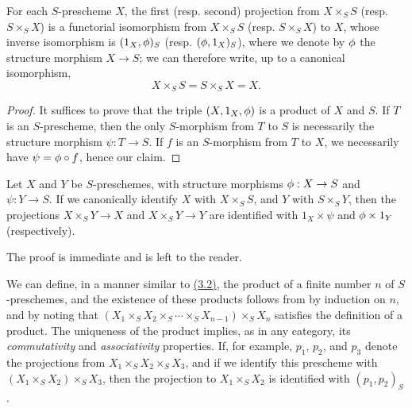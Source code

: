 \begin{proposition}[3.3.3]
\label{I.3.3.3}
For each $S$-prescheme $X$, the first (resp. second) projection from
$X\times_S S$ (resp. $S\times_S X$) is a functorial isomorphism from
$X\times_S S$ (resp. $S\times_S X$) to $X$, whose inverse isomorphism is
$(1_X,\phi)_S$ (resp. $(\phi,1_X)_S$), where we denote by $\phi$ the
structure morphism $X\to S$; we can therefore write, up to a canonical
isomorphism,
\[
  X\times_S S=S\times_S X=X.
\]
\end{proposition}

\begin{proof}
It suffices to prove that the triple $(X,1_X,\phi)$ is a product of $X$ and
$S$. If $T$ is an $S$-prescheme, then the only $S$-morphism from $T$ to $S$ is
necessarily the structure morphism $\psi:T\to S$. If $f$ is an $S$-morphism from
$T$ to $X$, we necessarily have $\psi=\phi\circ f$, hence our claim.
\end{proof}

\begin{corollary}[3.3.4]
\label{I.3.3.4}
Let $X$ and $Y$ be $S$-preschemes, with structure morphisms $\vphi:X\to S$ and $\psi:Y\to S$. If we canonically identify $X$ with $X\times_S S$, and $Y$
with $S\times_S Y$, then the projections $X\times_S Y\to X$ and $X\times_S Y\to Y$
are identified with $1_X\times\psi$ and $\phi\times 1_Y$ (respectively).
\end{corollary}

The proof is immediate and is left to the reader.

\begin{env}[3.3.5]
\label{I.3.3.5}
We can define, in a manner similar to \hyperref[subsection:I.3.2]{(3.2)}, the product of a
finite number $n$ of $S$-preschemes, and the existence of these products follows
from  by induction on $n$, and by noting that
$(X_1\times_S X_2\times_S\cdots\times_S X_{n-1})\times_S X_n$ satisfies the
definition of a product. The uniqueness of the product implies, as in any
category, its \emph{commutativity} and \emph{associativity} properties. If, for
example, $p_1$, $p_2$, and $p_3$ denote the projections from
$X_1\times_S X_2\times_S X_3$, and if we identify this prescheme with
$(X_1\times_S X_2)\times_S X_3$, then the projection to $X_1\times_S X_2$ is
identified with $(p_1,p_2)_S$.
\end{env}

